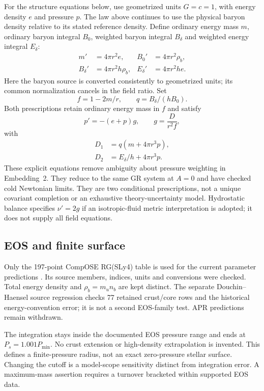 \documentclass[twocolumn,prd,superscriptaddress,nofootinbib]{revtex4-2}
\begin{document}
For the structure equations below, use geometrized units $G=c=1$,
with energy density $e$ and pressure $p$. The law above continues to use
the physical baryon density relative to its stated reference density.
Define ordinary energy mass $m$, ordinary baryon integral $B_0$, weighted
baryon integral $B_\delta$ and weighted energy integral $E_\delta$:
\begin{align}
 m'&=4\pi r^2 e,& B_0'&=4\pi r^2\rho_b,\\
 B_\delta'&=4\pi r^2h\rho_b,& E_\delta'&=4\pi r^2h e.
\end{align}
Here the baryon source is converted consistently to geometrized units;
its common normalization cancels in the field ratio. Set
\begin{equation}
 f=1-2m/r,\qquad q=B_\delta/(hB_0).
\end{equation}
Both prescriptions retain ordinary energy mass in $f$ and satisfy
\begin{equation}
 p'=-(e+p)g,\qquad g=\frac{D}{r^2 f},
\end{equation}
with
\begin{align}
 D_1&=q(m+4\pi r^3p),\label{eq:emb1}\\
 D_2&=E_\delta/h+4\pi r^3p.\label{eq:emb2}
\end{align}
These explicit equations remove ambiguity about pressure weighting in
Embedding~2. They reduce to the same GR system at $A=0$ and have checked
cold Newtonian limits. They are two conditional prescriptions, not a
unique covariant completion or an exhaustive theory-uncertainty model.
Hydrostatic balance specifies $\nu'=2g$ if an isotropic-fluid metric
interpretation is adopted; it does not supply all field equations.

\subsection{EOS and finite surface}
Only the 197-point CompOSE RG(SLy4) table is used for the current
parameter predictions \cite{CompOSE,WorkingEvidence}. Its source members,
indices, units and conversions were checked. Total energy density and
$\rho_b=m_u n_b$ are kept distinct. The separate Douchin--Haensel source
regression \cite{Douchin2001} checks 77 retained crust/core rows and the
historical energy-convention error; it is not a second EOS-family test.
APR predictions remain withdrawn.

The integration stays inside the documented EOS pressure range and ends
at $P_s=1.001P_{\min}$. No crust extension or high-density extrapolation
is invented. This defines a finite-pressure radius, not an exact
zero-pressure stellar surface. Changing the cutoff is a model-scope
sensitivity distinct from integration error. A maximum-mass assertion
requires a turnover bracketed within supported EOS data.
\end{document}
